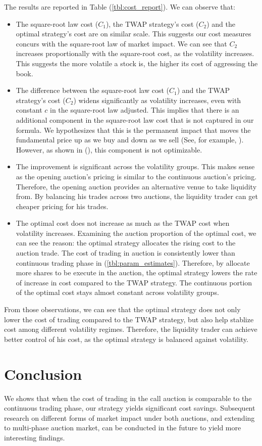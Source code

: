 The results are reported in Table (\ref{tbl:cost_report}). We can observe that:
\begin{itemize}
  \item The square-root law cost ($C_1$), the TWAP strategy's cost ($C_2$) and the optimal strategy's cost are on similar scale. This suggests our cost measures concurs with the square-root law of market impact. We can see that $C_2$ increases proportionally with the square-root cost, as the volatility increases. This suggests the more volatile a stock is, the higher its cost of aggressing the book.
  \item The difference between the square-root law cost ($C_1$) and the TWAP strategy's cost ($C_2$) widens significantly as volatility increases, even with constant $c$ in the square-root law adjusted. This implies that there is an additional component in the square-root law cost that is not captured in our formula. We hypothesizes that this is the permanent impact that moves the fundamental price up as we buy and down as we sell (See, for example, \cite{Kyle1985}). However, as shown in (\cite{Almgren2000}), this component is not optimizable.
  \item The improvement is significant across the volatility groups. This makes sense as the opening auction's pricing is similar to the continuous auction's pricing. Therefore, the opening auction provides an alternative venue to take liquidity from. By balancing his trades across two auctions, the liquidity trader can get cheaper pricing for his trades.
  \item The optimal cost does not increase as much as the TWAP cost when volatility increases. Examining the auction proportion of the optimal cost, we can see the reason: the optimal strategy allocates the rising cost to the auction trade. The cost of trading in auction is consistently lower than continuous trading phase in (\ref{tbl:param_estimates}). Therefore, by allocate more shares to be execute in the auction, the optimal strategy lowers the rate of increase in cost compared to the TWAP strategy. The continuous portion of the optimal cost stays almost constant across volatility groups.
\end{itemize}

From those observations, we can see that the optimal strategy does not only lower the cost of trading compared to the TWAP strategy, but also help stablize cost among different volatility regimes. Therefore, the liquidity trader can achieve better control of his cost, as the optimal strategy is balanced against volatility.



\section{Conclusion}\label{secConclusionAuction}
We shows that when the cost of trading in the call auction is comparable to the continuous trading phase, our strategy yields significant cost savings. Subsequent research on different forms of market impact under both auctions, and extending to multi-phase auction market, can be conducted in the future to yield more interesting findings.

